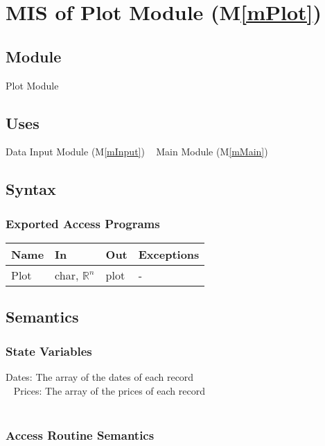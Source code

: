 \documentclass[12pt, titlepage]{article}
\newcommand{\mref}[1]{M\ref{#1}}
\begin{document}
\section{MIS of Plot Module (\mref{mPlot}) } 

\subsection{Module}
Plot Module
\subsection{Uses}
Data Input Module (\mref{mInput})
~\newline
Main Module (\mref{mMain})
\subsection{Syntax}

\subsubsection{Exported Access Programs}

\begin{center}
\begin{tabular}{p{2cm} p{4cm} p{2cm} p{2cm}}
\hline
\textbf{Name} & \textbf{In} & \textbf{Out} & \textbf{Exceptions} \\
\hline

Plot & char, $\mathbb{R}^n$ &plot &- \\

\hline
\end{tabular}
\end{center}

\subsection{Semantics}
\subsubsection{State Variables}
Dates: The array of the dates of each record\\ 
~\newline
Prices: The array of the prices of each record\\ 
~\newline


\subsubsection{Access Routine Semantics}
\end{document}
